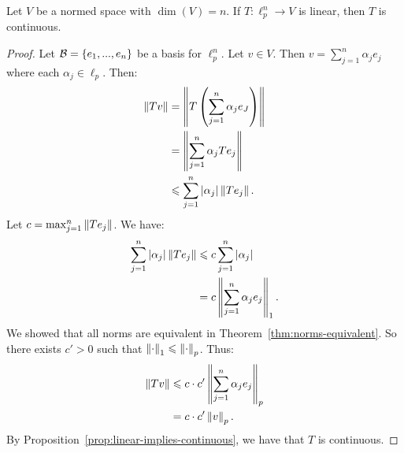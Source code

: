     \begin{corollary}\label{cor:finite-lin-implies-continuous}
        Let $V$ be a normed space with $\dim(V) = n$. If $T: \ell_p^n \rightarrow V$ is linear, then $T$ is continuous.
    \end{corollary}
        \begin{proof}
            Let $\mathcal{B} = \{e_1,...,e_n\}$ be a basis for $\ell_p^n$. Let $v \in V$. Then $v = \sum_{j = 1}^n \alpha_j e_j$ where each $\alpha_j \in \ell_p$. Then:
                \begin{equation*}
                \begin{split}
                    \left\lVert Tv \right\rVert
                    & = \left\lVert T \left( \sum_{j = 1}^n \alpha_j e_J \right) \right\rVert \\
                    & = \left\lVert \sum_{j = 1}^n \alpha_j Te_j \right\rVert \\
                    & \leqslant \sum_{j = 1}^n |\alpha_j| \left\lVert T e_j \right\rVert.
                \end{split}
                \end{equation*}
            Let $c = \max_{j = 1}^n \left\lVert T e_j \right\rVert$. We have:
                \begin{equation*}
                \begin{split}
                    \sum_{j = 1}^n |\alpha_j| \left\lVert T e_j \right\rVert 
                    & \leqslant c\sum_{j = 1}^n |\alpha_j| \\
                    & = c \left\lVert \sum_{j = 1}^n \alpha_j e_j \right\rVert_1.
                \end{split}
                \end{equation*}
            We showed that all norms are equivalent in Theorem~\ref{thm:norms-equivalent}. So there exists $c' > 0$ such that $\left\lVert \cdot \right\rVert_1 \leqslant \left\lVert \cdot \right\rVert_p$. Thus:
                \begin{equation*}
                \begin{split}
                    \left\lVert Tv \right\rVert
                    & \leqslant c\cdot c' \left\lVert \sum_{j = 1}^n \alpha_j e_j \right\rVert_p \\
                    & = c \cdot c' \left\lVert v \right\rVert_p.
                \end{split}
                \end{equation*}
            By Proposition~\ref{prop:linear-implies-continuous}, we have that $T$ is continuous.
        \end{proof}

